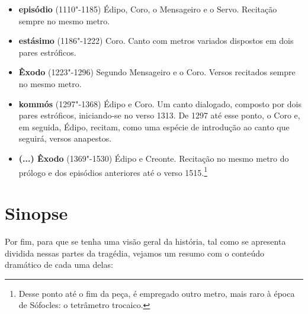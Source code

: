 \begin{itemize}
\item \textbf{ episódio} (1110"-1185)        
	 {Édipo, Coro, o Mensageiro e o Servo}. Recitação sempre no mesmo metro. 

\item \textbf{ estásimo} (1186"-1222)        
	 {Coro}. Canto com metros variados dispostos em dois pares estróficos. 

\item \textbf{Êxodo} (1223"-1296)                  
	 {Segundo Mensageiro e o Coro}. Versos recitados sempre no mesmo metro. 

\item \textbf{ kommós} (1297"-1368)         
	 {Édipo e Coro}. Um canto dialogado, composto por dois pares estróficos, iniciando-se no verso 1313. De 1297 até esse
	 ponto, o Coro e, em seguida, Édipo, recitam, como uma espécie de introdução ao canto que seguirá, versos anapestos.

\item \textbf{(...) Êxodo} (1369"-1530)   
	 {Édipo e Creonte}. Recitação no mesmo metro do prólogo e dos episódios anteriores até o verso 1515.\footnote{
	 Desse ponto até o fim da peça, é empregado outro metro, mais raro à época de Sófocles: o tetrâmetro trocaico.}  
\end{itemize}

\section{Sinopse}

Por fim, para que se tenha uma visão geral da história, tal como se
apresenta dividida nessas partes da tragédia, vejamos um resumo com o
conteúdo dramático de cada uma delas:

